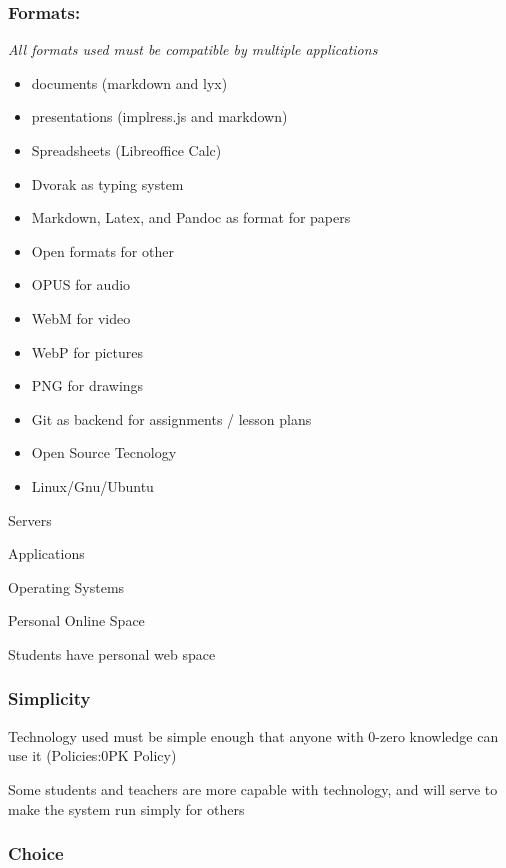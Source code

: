 \documentclass[CSHFoundation.tex]{subfiles}
\begin{document}
\subsubsection{Formats:}



\emph{All formats used must be compatible by multiple applications}



\begin{itemize}
\item documents (markdown and lyx)
\item presentations (implress.js and markdown)
\item Spreadsheets (Libreoffice Calc)
\item Dvorak as typing system
\item Markdown, Latex, and Pandoc as format for papers
\item Open formats for other
\item OPUS for audio
\item WebM for video
\item WebP for pictures
\item PNG for drawings
\item Git as backend for assignments / lesson plans
\item Open Source Tecnology
\item Linux/Gnu/Ubuntu
\end{itemize}Servers

Applications

Operating Systems

Personal Online Space

Students have personal web space



\subsubsection{Simplicity}

Technology used must be simple enough that anyone with 0-zero knowledge can use it (Policies:0PK Policy)

Some students and teachers are more capable with technology, and will serve to make the system run simply for others



\subsubsection{Choice}
\end{document}
